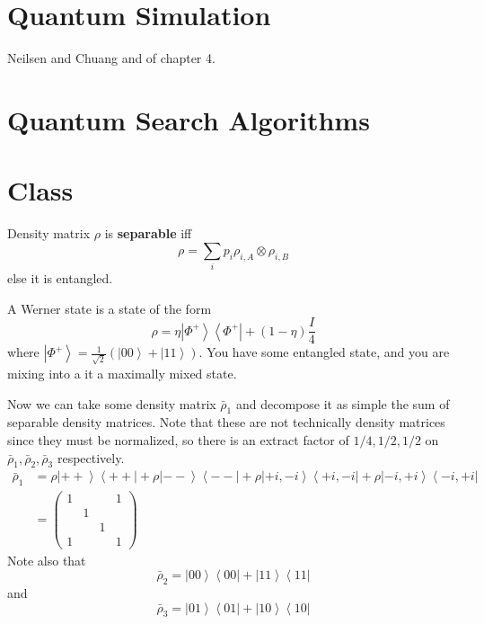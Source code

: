 \documentclass{article}
\newcommand{\ket}[1]{\ensuremath{\left|#1\right\rangle}}
\newcommand{\bra}[1]{\ensuremath{\left\langle#1\right|}}
\begin{document}
    \begin{lemma} 

    \end{lemma}

\section{Quantum Simulation}

  Neilsen and Chuang and of chapter 4. 

\section{Quantum Search Algorithms}


\section{Class} 
  
  \begin{definition}[Separable]
    Density matrix $\rho$ is \textbf{separable} iff
    \begin{equation}
      \rho = \sum_i p_i \rho_{i, A} \otimes \rho_{i, B}
    \end{equation}
    else it is entangled. 
  \end{definition}

  \begin{definition}
    A Werner state is a state of the form 
    \begin{equation}
      \rho = \eta \ket{\Phi^+}\bra{\Phi^+} + (1-\eta) \frac{I}{4}
    \end{equation}
    where $\ket{\Phi^+} = \frac{1}{\sqrt{2}} (\ket{00} + \ket{11})$. You have some entangled state, and you are mixing into a it a maximally mixed state. 
  \end{definition}

  Now we can take some density matrix $\bar{\rho}_1$ and decompose it as simple the sum of separable density matrices. Note that these are not technically density matrices since they must be normalized, so there is an extract factor of $1/4, 1/2, 1/2$ on $\bar{\rho}_1, \bar{\rho}_2, \bar{\rho}_3$ respectively. 
  \begin{align}
    \bar{\rho}_1 & = \rho \ket{++} \bra{++} + \rho \ket{- -} \bra{--} + \rho \ket{+i, -i} \bra{+i, -i} + \rho \ket{-i, +i} \bra{-i, +i} \\
                 & = \begin{pmatrix} 1 & & & 1 \\ & 1 & & \\ & & 1 & \\ 1 & & & 1 \end{pmatrix} 
  \end{align}
  Note also that 
  \begin{equation}
    \bar{\rho}_2 = \ket{00} \bra{00} + \ket{11} \bra{11} 
  \end{equation}
  and 
  \begin{equation}
    \bar{\rho}_3 = \ket{01}\bra{01} + \ket{10}\bra{10} 
  \end{equation}
\end{document}
